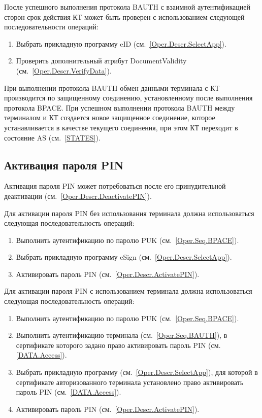 После успешного выполнения протокола BAUTH 
с взаимной аутентификацией сторон
срок действия КТ может быть проверен с использованием
следующей последовательности операций:
%
\begin{enumerate}
\item Выбрать прикладную программу eID (см.~\ref{Oper.Descr.SelectApp}).
\item Проверить дополнительный атрибут DocumentValidity (см.~\ref{Oper.Descr.VerifyData}).
\end{enumerate}

При выполнении протокола BAUTH обмен данными терминала с КТ производится по 
защищенному соединению, установленному после выполнения протокола BPACE. 
При успешном выполнении протокола BAUTH между терминалом и КТ создается новое 
защищенное соединение, которое устанавливается в качестве текущего
соединения, при этом КТ переходит в состояние AS (см.~\ref{STATES}).

\subsection{Активация пароля PIN}
\label{Oper.Seq.ActivatePIN}

Активация пароля PIN может потребоваться после его
принудительной деактивации (см.~\ref{Oper.Descr.DeactivatePIN}).

Для активации пароля PIN без использования терминала
должна использоваться следующая последовательность операций:
%
\begin{enumerate}
\item Выполнить аутентификацию по паролю PUK (см.~\ref{Oper.Seq.BPACE}).

\item Выбрать прикладную программу eSign (см.~\ref{Oper.Descr.SelectApp}).

\item Активировать пароль PIN (см.~\ref{Oper.Descr.ActivatePIN}).

\end{enumerate}

Для активации пароля PIN с использованием терминала
должна использоваться следующая последовательность операций:

\begin{enumerate}
\item Выполнить аутентификацию по паролю PUK (см.~\ref{Oper.Seq.BPACE}).

\item Выполнить аутентификацию терминала (см.~\ref{Oper.Seq.BAUTH}), 
в сертификате которого задано право активировать пароль PIN (см. \ref{DATA.Access}).

\item Выбрать прикладную программу  (см.~\ref{Oper.Descr.SelectApp}), 
для которой в сертификате авторизованного терминала установлено 
право активировать пароль PIN (см.~\ref{DATA.Access}).

\item Активировать пароль PIN (см.~\ref{Oper.Descr.ActivatePIN}).

\end{enumerate}

